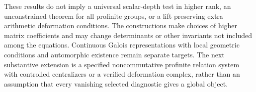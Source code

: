 These results do not imply a universal scalar-depth test in higher rank, an unconstrained theorem for all profinite groups, or a lift preserving extra arithmetic deformation conditions. The constructions make choices of higher matrix coefficients and may change determinants or other invariants not included among the equations. Continuous Galois representations with local geometric conditions and automorphic existence remain separate targets. The next substantive extension is a specified noncommutative profinite relation system with controlled centralizers or a verified deformation complex, rather than an assumption that every vanishing selected diagnostic gives a global object.
